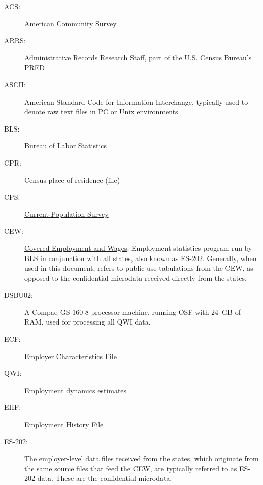                       

%
%
%

\begin{description}
\item[ACS:]  American Community Survey
\item[ARRS:]  Administrative Records Research Staff, part of
  the U.S. Census Bureau's PRED
\item[ASCII:]  American Standard Code for Information
  Interchange, typically used to denote raw text files in PC or Unix environments
\item[BLS:]  \href{http://www.bls.gov}{Bureau of Labor Statistics}
\item[CPR:]  Census place of residence (file)
\item[CPS:]  \href{http://www.bls.gov/cps/home.htm}{Current Population Survey}
\item[CEW:]  \href{http://www.bls.gov/cew/home.htm}{Covered Employment and Wages}. Employment statistics program run by BLS in
  conjunction with all states, also known as ES-202. Generally, when used
  in this document, refers to public-use tabulations from the CEW, as
  opposed to the confidential microdata received directly from the states.
\item[DSBU02:]  A Compaq GS-160 8-processor machine, running
  OSF with  24~GB of RAM, used for processing all QWI data.
\item[ECF:]  Employer Characteristics  File 
\item[QWI:]  Employment dynamics estimates
\item[EHF:]  Employment History File
\item[ES-202:]  The employer-level data files received from the states,
  which originate from the same source files that feed the CEW, are
  typically referred to as ES-202 data. These are the confidential microdata.

\end{description}
